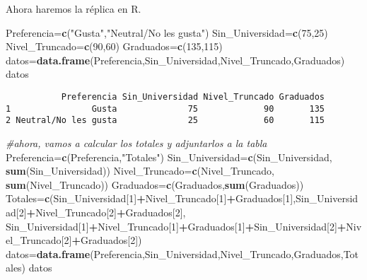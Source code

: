 \documentclass[a4paper,oneside,openany]{book}
\newenvironment{Shaded}{\begin{snugshade}}{\end{snugshade}}
\newcommand{\KeywordTok}[1]{\textcolor[rgb]{0.13,0.29,0.53}{\textbf{#1}}}
\newcommand{\DecValTok}[1]{\textcolor[rgb]{0.00,0.00,0.81}{#1}}
\newcommand{\StringTok}[1]{\textcolor[rgb]{0.31,0.60,0.02}{#1}}
\newcommand{\CommentTok}[1]{\textcolor[rgb]{0.56,0.35,0.01}{\textit{#1}}}
\newcommand{\OperatorTok}[1]{\textcolor[rgb]{0.81,0.36,0.00}{\textbf{#1}}}
\newcommand{\NormalTok}[1]{#1}
\begin{document}
Ahora haremos la réplica en R.

\begin{Shaded}
\begin{Highlighting}[]
\NormalTok{Preferencia=}\KeywordTok{c}\NormalTok{(}\StringTok{"Gusta"}\NormalTok{,}\StringTok{"Neutral/No les gusta"}\NormalTok{)}
\NormalTok{Sin_Universidad=}\KeywordTok{c}\NormalTok{(}\DecValTok{75}\NormalTok{,}\DecValTok{25}\NormalTok{)}
\NormalTok{Nivel_Truncado=}\KeywordTok{c}\NormalTok{(}\DecValTok{90}\NormalTok{,}\DecValTok{60}\NormalTok{)}
\NormalTok{Graduados=}\KeywordTok{c}\NormalTok{(}\DecValTok{135}\NormalTok{,}\DecValTok{115}\NormalTok{)}
\NormalTok{datos=}\KeywordTok{data.frame}\NormalTok{(Preferencia,Sin_Universidad,Nivel_Truncado,Graduados)}
\NormalTok{datos}
\end{Highlighting}
\end{Shaded}

\begin{verbatim}
           Preferencia Sin_Universidad Nivel_Truncado Graduados
1                Gusta              75             90       135
2 Neutral/No les gusta              25             60       115
\end{verbatim}

\begin{Shaded}
\begin{Highlighting}[]
\CommentTok{#ahora, vamos a calcular los totales y adjuntarlos a la tabla}
\NormalTok{Preferencia=}\KeywordTok{c}\NormalTok{(Preferencia,}\StringTok{"Totales"}\NormalTok{)}
\NormalTok{Sin_Universidad=}\KeywordTok{c}\NormalTok{(Sin_Universidad, }\KeywordTok{sum}\NormalTok{(Sin_Universidad))}
\NormalTok{Nivel_Truncado=}\KeywordTok{c}\NormalTok{(Nivel_Truncado, }\KeywordTok{sum}\NormalTok{(Nivel_Truncado))}
\NormalTok{Graduados=}\KeywordTok{c}\NormalTok{(Graduados,}\KeywordTok{sum}\NormalTok{(Graduados))}
\NormalTok{Totales=}\KeywordTok{c}\NormalTok{(Sin_Universidad[}\DecValTok{1}\NormalTok{]}\OperatorTok{+}\NormalTok{Nivel_Truncado[}\DecValTok{1}\NormalTok{]}\OperatorTok{+}\NormalTok{Graduados[}\DecValTok{1}\NormalTok{],Sin_Universidad[}\DecValTok{2}\NormalTok{]}\OperatorTok{+}\NormalTok{Nivel_Truncado[}\DecValTok{2}\NormalTok{]}\OperatorTok{+}\NormalTok{Graduados[}\DecValTok{2}\NormalTok{],}
\NormalTok{           Sin_Universidad[}\DecValTok{1}\NormalTok{]}\OperatorTok{+}\NormalTok{Nivel_Truncado[}\DecValTok{1}\NormalTok{]}\OperatorTok{+}\NormalTok{Graduados[}\DecValTok{1}\NormalTok{]}\OperatorTok{+}\NormalTok{Sin_Universidad[}\DecValTok{2}\NormalTok{]}\OperatorTok{+}\NormalTok{Nivel_Truncado[}\DecValTok{2}\NormalTok{]}\OperatorTok{+}\NormalTok{Graduados[}\DecValTok{2}\NormalTok{])}
\NormalTok{datos=}\KeywordTok{data.frame}\NormalTok{(Preferencia,Sin_Universidad,Nivel_Truncado,Graduados,Totales)}
\NormalTok{datos}
\end{Highlighting}
\end{Shaded}
\end{document}
